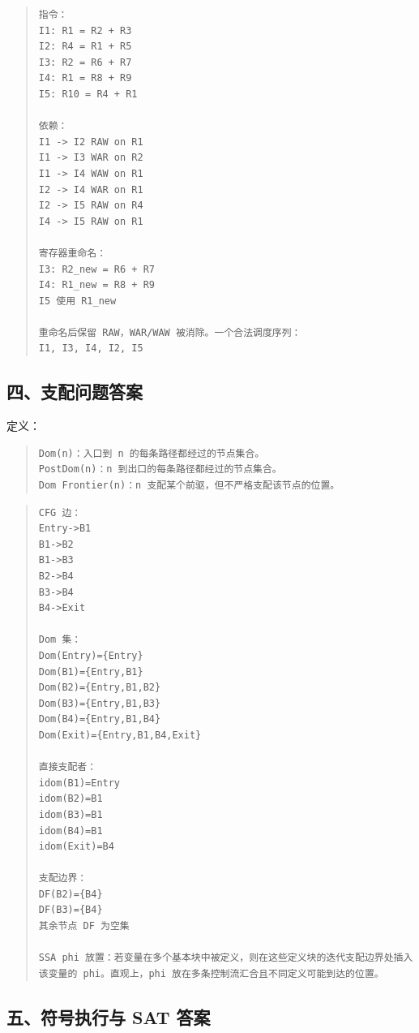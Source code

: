 \documentclass[UTF8,zihao=-4]{ctexart}
\begin{document}
\begin{quote}
\footnotesize
\begin{verbatim}
指令：
I1: R1 = R2 + R3
I2: R4 = R1 + R5
I3: R2 = R6 + R7
I4: R1 = R8 + R9
I5: R10 = R4 + R1

依赖：
I1 -> I2 RAW on R1
I1 -> I3 WAR on R2
I1 -> I4 WAW on R1
I2 -> I4 WAR on R1
I2 -> I5 RAW on R4
I4 -> I5 RAW on R1

寄存器重命名：
I3: R2_new = R6 + R7
I4: R1_new = R8 + R9
I5 使用 R1_new

重命名后保留 RAW，WAR/WAW 被消除。一个合法调度序列：
I1, I3, I4, I2, I5
\end{verbatim}
\end{quote}



\subsection{四、支配问题答案}


定义：


\begin{quote}
\footnotesize
\begin{verbatim}
Dom(n)：入口到 n 的每条路径都经过的节点集合。
PostDom(n)：n 到出口的每条路径都经过的节点集合。
Dom Frontier(n)：n 支配某个前驱，但不严格支配该节点的位置。
\end{verbatim}
\end{quote}


\begin{quote}
\footnotesize
\begin{verbatim}
CFG 边：
Entry->B1
B1->B2
B1->B3
B2->B4
B3->B4
B4->Exit

Dom 集：
Dom(Entry)={Entry}
Dom(B1)={Entry,B1}
Dom(B2)={Entry,B1,B2}
Dom(B3)={Entry,B1,B3}
Dom(B4)={Entry,B1,B4}
Dom(Exit)={Entry,B1,B4,Exit}

直接支配者：
idom(B1)=Entry
idom(B2)=B1
idom(B3)=B1
idom(B4)=B1
idom(Exit)=B4

支配边界：
DF(B2)={B4}
DF(B3)={B4}
其余节点 DF 为空集

SSA phi 放置：若变量在多个基本块中被定义，则在这些定义块的迭代支配边界处插入该变量的 phi。直观上，phi 放在多条控制流汇合且不同定义可能到达的位置。
\end{verbatim}
\end{quote}



\subsection{五、符号执行与 SAT 答案}
\end{document}
